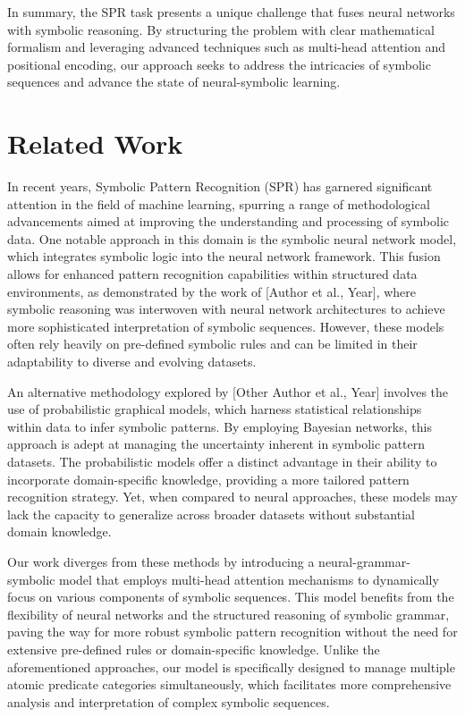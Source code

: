 \documentclass{article}
\begin{document}
In summary, the SPR task presents a unique challenge that fuses neural networks with symbolic reasoning. By structuring the problem with clear mathematical formalism and leveraging advanced techniques such as multi-head attention and positional encoding, our approach seeks to address the intricacies of symbolic sequences and advance the state of neural-symbolic learning.

\section{Related Work}
In recent years, Symbolic Pattern Recognition (SPR) has garnered significant attention in the field of machine learning, spurring a range of methodological advancements aimed at improving the understanding and processing of symbolic data. One notable approach in this domain is the symbolic neural network model, which integrates symbolic logic into the neural network framework. This fusion allows for enhanced pattern recognition capabilities within structured data environments, as demonstrated by the work of [Author et al., Year], where symbolic reasoning was interwoven with neural network architectures to achieve more sophisticated interpretation of symbolic sequences. However, these models often rely heavily on pre-defined symbolic rules and can be limited in their adaptability to diverse and evolving datasets.

An alternative methodology explored by [Other Author et al., Year] involves the use of probabilistic graphical models, which harness statistical relationships within data to infer symbolic patterns. By employing Bayesian networks, this approach is adept at managing the uncertainty inherent in symbolic pattern datasets. The probabilistic models offer a distinct advantage in their ability to incorporate domain-specific knowledge, providing a more tailored pattern recognition strategy. Yet, when compared to neural approaches, these models may lack the capacity to generalize across broader datasets without substantial domain knowledge.

Our work diverges from these methods by introducing a neural-grammar-symbolic model that employs multi-head attention mechanisms to dynamically focus on various components of symbolic sequences. This model benefits from the flexibility of neural networks and the structured reasoning of symbolic grammar, paving the way for more robust symbolic pattern recognition without the need for extensive pre-defined rules or domain-specific knowledge. Unlike the aforementioned approaches, our model is specifically designed to manage multiple atomic predicate categories simultaneously, which facilitates more comprehensive analysis and interpretation of complex symbolic sequences.
\end{document}
